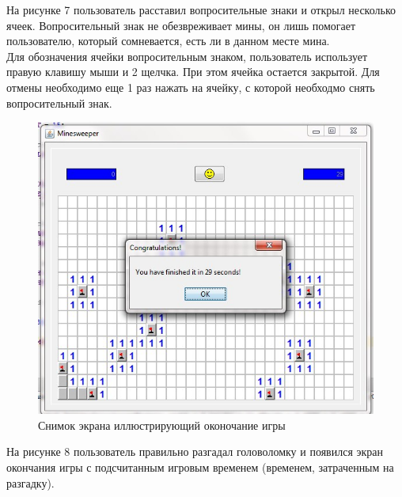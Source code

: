 На рисунке 7 пользователь расставил вопросительные знаки и открыл несколько ячеек. Вопросительный знак не обезвреживает мины, он лишь помогает пользователю, который сомневается, есть ли в данном месте мина.\\

Для обозначения ячейки вопросительным знаком, пользователь использует правую клавишу мыши и 2 щелчка. При этом ячейка остается закрытой. Для отмены необходимо еще 1 раз нажать на ячейку, с которой необходмо снять вопросительный знак.

\begin{figure}[H]
	\begin{center}
		\includegraphics[scale=0.7]{images/6.jpg}
		\caption{Снимок экрана иллюстрирующий оконочание игры} 
		\label{pic:pic_name} %
	\end{center}
\end{figure}

На рисунке 8 пользователь правильно разгадал головоломку и появился экран окончания игры с подсчитанным игровым временем (временем, затраченным на разгадку).

